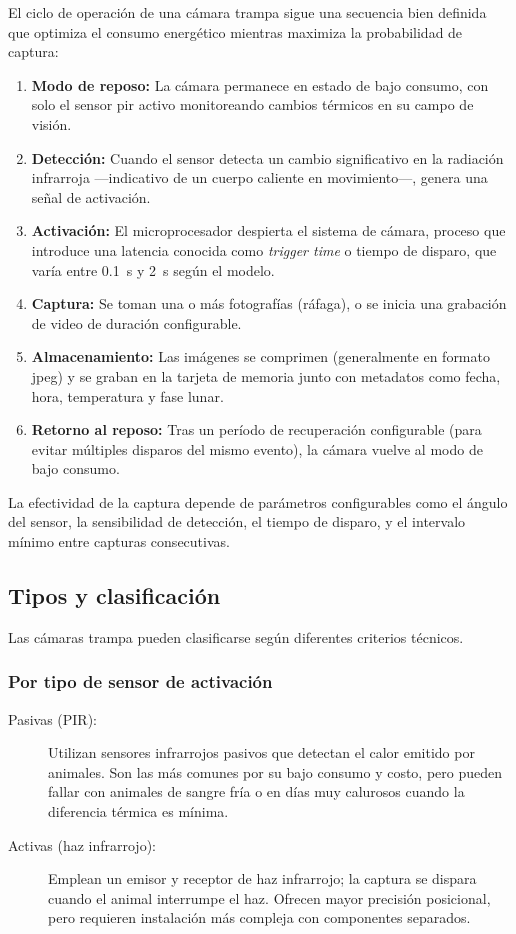 \documentclass[a4paper, 12pt]{report}
\begin{document}
El ciclo de operación de una cámara trampa sigue una secuencia bien definida
que optimiza el consumo energético mientras maximiza la probabilidad de
captura:

\begin{enumerate}
  \item \textbf{Modo de reposo:} La cámara permanece en estado de bajo consumo,
    con solo el sensor \gls{pir} activo monitoreando cambios térmicos en
    su campo de visión.
  \item \textbf{Detección:} Cuando el sensor detecta un cambio significativo
    en la radiación infrarroja ---indicativo de un cuerpo caliente en
    movimiento---, genera una señal de activación.
  \item \textbf{Activación:} El microprocesador despierta el sistema de cámara,
    proceso que introduce una latencia conocida como \textit{trigger time}
    o tiempo de disparo, que varía entre \qty{0.1}{s} y \qty{2}{s} según el modelo.
  \item \textbf{Captura:} Se toman una o más fotografías (ráfaga), o se inicia
    una grabación de video de duración configurable.
  \item \textbf{Almacenamiento:} Las imágenes se comprimen (generalmente en
    formato \gls{jpeg}) y se graban en la tarjeta de memoria junto con
    metadatos como fecha, hora, temperatura y fase lunar.
  \item \textbf{Retorno al reposo:} Tras un período de recuperación configurable
    (para evitar múltiples disparos del mismo evento), la cámara vuelve
    al modo de bajo consumo.
\end{enumerate}

La efectividad de la captura depende de parámetros configurables como el
ángulo del sensor, la sensibilidad de detección, el tiempo de disparo, y el
intervalo mínimo entre capturas consecutivas.

\subsection{Tipos y clasificación}

Las cámaras trampa pueden clasificarse según diferentes criterios técnicos.

\subsubsection{Por tipo de sensor de activación}
\begin{description}
  \item[Pasivas (PIR):] Utilizan sensores infrarrojos pasivos que detectan
    el calor emitido por animales. Son las más comunes por su bajo
    consumo y costo, pero pueden fallar con animales de sangre fría
    o en días muy calurosos cuando la diferencia térmica es mínima.
  \item[Activas (haz infrarrojo):] Emplean un emisor y receptor de haz
    infrarrojo; la captura se dispara cuando el animal interrumpe el
    haz. Ofrecen mayor precisión posicional, pero requieren instalación
    más compleja con componentes separados.
\end{description}
\end{document}
